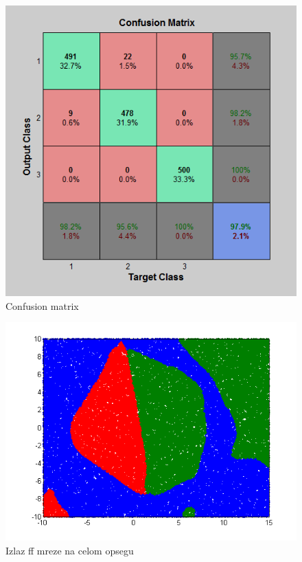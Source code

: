\documentclass{report}
\begin{document}
\begin{enumerate}
\begin{enumerate}
\begin{figure}[!h]
\begin{center}
\includegraphics[scale=0.7]{B1confussionFF2.png}
\caption{Confusion matrix}
\end{center}
\end{figure}

\begin{figure}[!h]
\begin{center}
\includegraphics[scale=0.8]{B1outputFF2Random50000.png}
\caption{Izlaz ff mreze na celom opsegu}
\end{center}
\end{figure}










\end{enumerate}
\end{enumerate}
\end{document}
